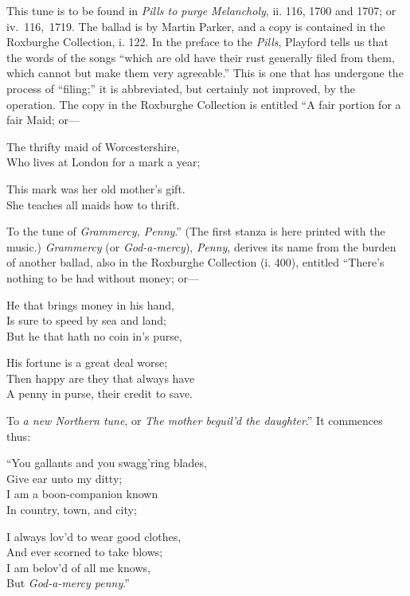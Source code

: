This tune is to be found in \textit{ Pills to purge Melancholy}, ii. 116, 1700 and 1707;
or iv.~116,~1719. The ballad is by Martin Parker, and a copy is contained in
the Roxburghe Collection, i. 122. In the preface to the \textit{Pills}, Playford tells us
that the words of the songs “which are old have their rust generally filed from
them, which cannot but make them very agreeable.” This is one that has
undergone the process of “filing;” it is abbreviated, but certainly not improved,
by the operation. The copy in the Roxburghe Collection is entitled “A fair
portion for a fair Maid; or—
\settowidth{\versewidth}{The thrifty maid of Worcestershire,}
\begin{dcverse}The thrifty maid of Worcestershire,\\
Who lives at London for a mark a year;

This mark was her old mother’s gift.\\
She teaches all maids how to thrift.
\end{dcverse}
To the tune of \textit{Grammercy, Penny}.” (The first stanza is here printed with the
music.) \textit{Grammercy} (or \textit{God-a-mercy}), \textit{Penny}, derives its name from the burden
of another ballad, also in the Roxburghe Collection (i. 400), entitled “There’s
nothing to be had without money; or—
\begin{dcverse}He that brings money in his hand,\\
Is sure to speed by sea and land;\\
But he that hath no coin in’s purse,

His fortune is a great deal worse;\\
Then happy are they that always have\\
A penny in purse, their credit to save.
\end{dcverse}
To \textit{a new Northern tune}, or\textit{ The mother beguil’d the daughter}.” It commences thus:
\begin{dcverse}“You gallants and you swagg’ring blades,\\
Give ear unto my ditty;\\
I am a boon-companion known\\
In country, town, and city;

I always lov'd to wear good clothes,\\
And ever scorned to take blows;\\
I am belov’d of all me knows,\\
But \textit{God-a-mercy penny}.”
\end{dcverse}

